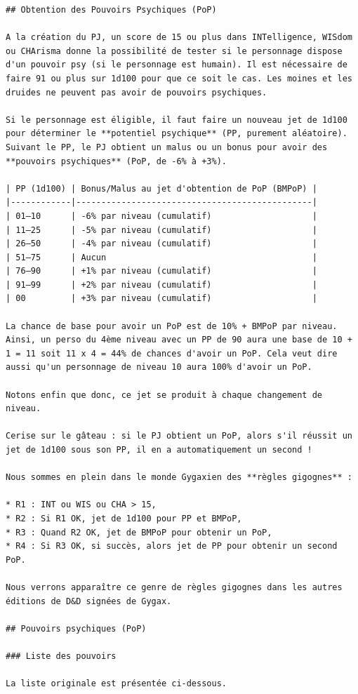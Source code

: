 \documentclass[11pt]{article}
\begin{document}
{\begin{verbatim}
## Obtention des Pouvoirs Psychiques (PoP)

A la création du PJ, un score de 15 ou plus dans INTelligence, WISdom ou CHArisma donne la possibilité de tester si le personnage dispose d'un pouvoir psy (si le personnage est humain). Il est nécessaire de faire 91 ou plus sur 1d100 pour que ce soit le cas. Les moines et les druides ne peuvent pas avoir de pouvoirs psychiques.

Si le personnage est éligible, il faut faire un nouveau jet de 1d100 pour déterminer le **potentiel psychique** (PP, purement aléatoire). Suivant le PP, le PJ obtient un malus ou un bonus pour avoir des **pouvoirs psychiques** (PoP, de -6% à +3%).

| PP (1d100) | Bonus/Malus au jet d'obtention de PoP (BMPoP) |
|------------|-----------------------------------------------|
| 01–10      | -6% par niveau (cumulatif)                    |
| 11–25      | -5% par niveau (cumulatif)                    |
| 26–50      | -4% par niveau (cumulatif)                    |
| 51–75      | Aucun                                         |
| 76–90      | +1% par niveau (cumulatif)                    |
| 91–99      | +2% par niveau (cumulatif)                    |
| 00         | +3% par niveau (cumulatif)                    |

La chance de base pour avoir un PoP est de 10% + BMPoP par niveau. Ainsi, un perso du 4ème niveau avec un PP de 90 aura une base de 10 + 1 = 11 soit 11 x 4 = 44% de chances d'avoir un PoP. Cela veut dire aussi qu'un personnage de niveau 10 aura 100% d'avoir un PoP.

Notons enfin que donc, ce jet se produit à chaque changement de niveau.

Cerise sur le gâteau : si le PJ obtient un PoP, alors s'il réussit un jet de 1d100 sous son PP, il en a automatiquement un second !

Nous sommes en plein dans le monde Gygaxien des **règles gigognes** :

* R1 : INT ou WIS ou CHA > 15,
* R2 : Si R1 OK, jet de 1d100 pour PP et BMPoP,
* R3 : Quand R2 OK, jet de BMPoP pour obtenir un PoP,
* R4 : Si R3 OK, si succès, alors jet de PP pour obtenir un second PoP.

Nous verrons apparaître ce genre de règles gigognes dans les autres éditions de D&D signées de Gygax.

## Pouvoirs psychiques (PoP)

### Liste des pouvoirs

La liste originale est présentée ci-dessous.


\end{verbatim}}
\end{document}
